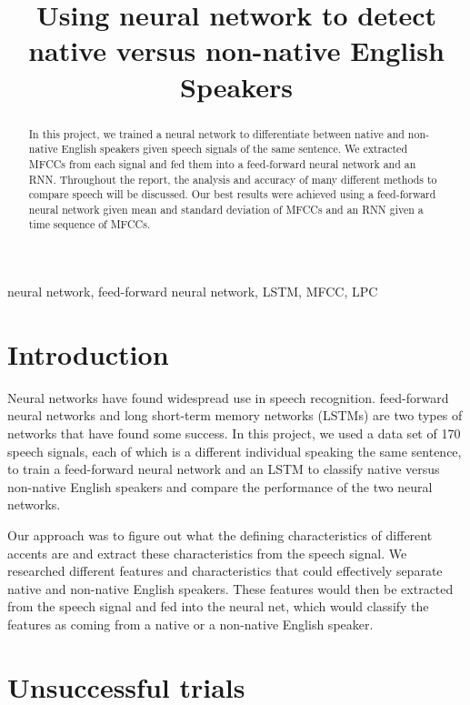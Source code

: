 \documentclass{article}
\title{Using neural network to detect native versus non-native English Speakers}
\begin{document}

\maketitle

\begin{abstract}
	In this project, we trained a neural network to differentiate between native and non-native English speakers given speech signals of the same sentence.
	We extracted MFCCs from each signal and fed them into a feed-forward neural network and an RNN.
	Throughout the report, the analysis and accuracy of many different methods to compare speech will be discussed. 
	Our best results were achieved using a feed-forward neural network given mean and standard deviation of MFCCs and an RNN given a time sequence of MFCCs.
\end{abstract}

\begin{keywords}
neural network,
feed-forward neural network,
LSTM,
MFCC,
LPC
\end{keywords}

\section{Introduction}
\label{sec:intro}

Neural networks have found widespread use in speech recognition.
feed-forward neural networks \cite{microsoft} and long short-term memory networks (LSTMs) \cite{google} are two types of networks that have found some success. 
In this project, we used a data set of 170 speech signals, each of which is a different individual speaking the same sentence, to train a feed-forward neural network and an LSTM to classify native versus non-native English speakers and compare the performance of the two neural networks. 

Our approach was to figure out what the defining characteristics of different accents are and extract these characteristics from the speech signal.
We researched different features and characteristics that could effectively separate native and non-native English speakers.
These features would then be extracted from the speech signal and fed into the neural net, which would classify the features as coming from a native or a non-native English speaker.

\section{Unsuccessful trials}
\label{sec:unsuccessful}
\end{document}
